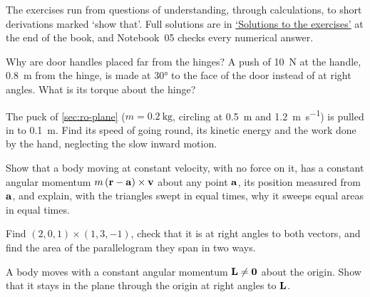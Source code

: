 \label{sec:ro-exercises}

The exercises run from questions of understanding, through calculations,
to short derivations marked `show that'. Full solutions are in
\hyperref[sec:ro-solutions]{`Solutions to the exercises'} at the end of
the book, and Notebook~05 checks every numerical answer.

\begin{exercise}
\label{ex:ro-door}
Why are door handles placed far from the hinges? A push of
\SI{10}{\newton} at the handle, \SI{0.8}{\metre} from the hinge, is made at
\ang{30} to the face of the door instead of at right angles. What is its
torque about the hinge?
\end{exercise}

\begin{exercise}
\label{ex:ro-pull}
The puck of \cref{sec:ro-plane} ($m = \SI{0.2}{\kilogram}$, circling at
\SI{0.5}{\metre} and \SI{1.2}{\metre\per\second}) is pulled in to
\SI{0.1}{\metre}. Find its speed of going round, its kinetic energy and the
work done by the hand, neglecting the slow inward motion.
\end{exercise}

\begin{exercise}
\label{ex:ro-straight}
Show that a body moving at constant velocity, with no force on it, has a constant
angular momentum $m\,(\bm{\mathrm{r}} - \bm{\mathrm{a}})\times\bm{\mathrm{v}}$ about any point
$\bm{\mathrm{a}}$, its position measured from $\bm{\mathrm{a}}$, and explain, with the triangles
swept in equal times, why it sweeps equal areas in equal times.
\end{exercise}

\begin{exercise}
\label{ex:ro-product}
Find $(2, 0, 1)\times(1, 3, -1)$, check that it is at right angles to both
vectors, and find the area of the parallelogram they span in two ways.
\end{exercise}

\begin{exercise}
\label{ex:ro-plane}
A body moves with a constant angular momentum $\bm{\mathrm{L}} \neq \bm{\mathrm{0}}$ about the
origin. Show that it stays in the plane through the origin at right angles
to $\bm{\mathrm{L}}$.
\end{exercise}

